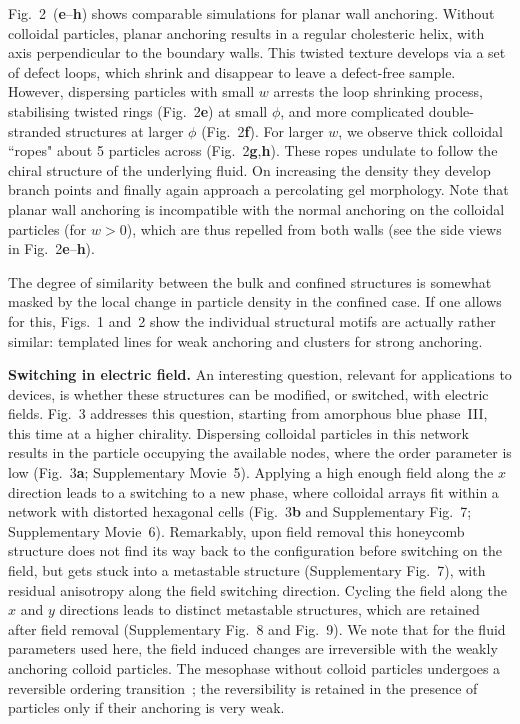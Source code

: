 \documentclass[12pt]{article}
\begin{document}
Fig.~2~(\textbf{e}--\textbf{h}) shows comparable simulations for planar wall
anchoring.  Without colloidal particles, planar anchoring results in a
regular cholesteric helix,
with axis perpendicular to the boundary walls. 
This twisted texture develops via a set of defect loops,
which shrink and disappear to leave a defect-free sample. However,
dispersing particles with small $w$ arrests the loop shrinking process,
stabilising twisted rings (Fig.~2\textbf{e}) at small $\phi$, and more
complicated  double-stranded structures at larger $\phi$ (Fig.~2\textbf{f}).
For larger $w$, we observe thick colloidal ``ropes" about 5 particles across
(Fig.~2\textbf{g},\textbf{h}). These ropes undulate to follow the chiral
structure of the 
underlying fluid. On increasing the density they develop branch points and
finally again approach a percolating gel morphology. Note that planar wall
anchoring is incompatible with the normal anchoring on the colloidal
particles (for $w>0$), which are thus repelled from both walls
(see the side views in Fig.~2\textbf{e}--\textbf{h}).

The degree of similarity between
the bulk and confined structures is somewhat masked by the local
change in particle density in the confined case. If one allows for
this, Figs.~1 and~2 show the individual structural motifs are actually
rather similar: templated lines for weak anchoring and clusters for
strong anchoring.


\medskip
\noindent
\textbf{Switching in electric field.}
An interesting question, relevant for applications to devices, is whether 
these structures can be modified, or switched, with electric fields.
Fig.~3 addresses this question, starting from amorphous blue phase~III,
this time at a higher chirality. Dispersing colloidal particles in this
network
results in the particle occupying the available nodes, where the order
parameter is low (Fig.~3\textbf{a}; Supplementary Movie~5).
Applying a high enough field 
along the $x$ direction leads to a switching to a new phase, where colloidal 
arrays fit within a network with distorted hexagonal cells (Fig.~3\textbf{b} 
and Supplementary Fig.~7; Supplementary Movie~6). 
Remarkably, upon field removal this honeycomb structure does not find its 
way back to the 
configuration before switching on the field, but gets stuck into a metastable 
structure (Supplementary Fig.~7), with residual anisotropy along the field
switching 
direction. Cycling the field along the $x$ and $y$ directions leads to
distinct metastable structures, which are retained after field removal
(Supplementary Fig.~8 and Fig.~9).
We note that for the fluid parameters used here, the field induced
changes are irreversible with the weakly anchoring colloid particles.
The mesophase without colloid particles undergoes
a reversible ordering transition~\cite{bp3}; the reversibility
is retained in the
presence of particles only if their anchoring is very weak.
\end{document}

